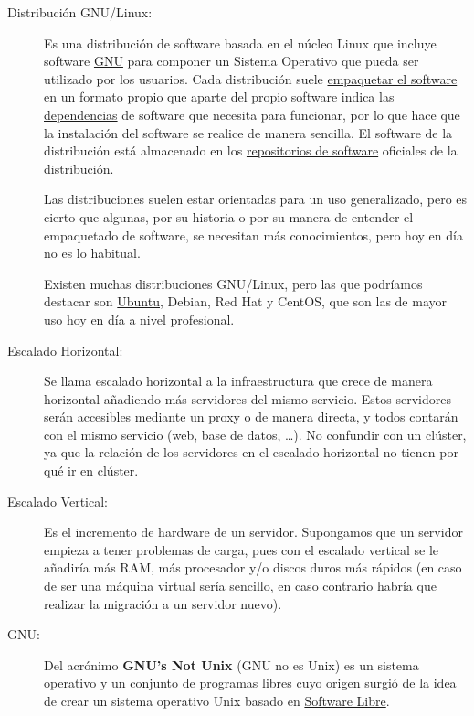 \begin{description}
    \hypertarget{distribucion_gnu_linux}{}
    \item [Distribución GNU/Linux:] Es una distribución de software basada en el núcleo Linux que incluye software \hyperlink{gnu}{GNU} para componer un Sistema Operativo que pueda ser utilizado por los usuarios. Cada distribución suele \hyperlink{paquete_de_software}{empaquetar el software} en un formato propio que aparte del propio software indica las \hyperlink{dependencia_de_software}{dependencias} de software que necesita para funcionar, por lo que hace que la instalación del software se realice de manera sencilla. El software de la distribución está almacenado en los \hyperlink{repositorio_de_software}{repositorios de software} oficiales de la distribución.

    Las distribuciones suelen estar orientadas para un uso generalizado, pero es cierto que algunas, por su historia o por su manera de entender el empaquetado de software, se necesitan más conocimientos, pero hoy en día no es lo habitual.

    Existen muchas distribuciones GNU/Linux, pero las que podríamos destacar son \hyperlink{ubuntu}{Ubuntu}, Debian, Red Hat y CentOS, que son las de mayor uso hoy en día a nivel profesional.

    \hypertarget{escalado_horizontal}{}
    \item[Escalado Horizontal:] Se llama escalado horizontal a la infraestructura que crece de manera horizontal añadiendo más servidores del mismo servicio. Estos servidores serán accesibles mediante un proxy o de manera directa, y todos contarán con el mismo servicio (web, base de datos, …). No confundir con un clúster, ya que la relación de los servidores en el escalado horizontal no tienen por qué ir en clúster.

    \hypertarget{escalado_vertical}{}
    \item[Escalado Vertical:] Es el incremento de hardware de un servidor. Supongamos que un servidor empieza a tener problemas de carga, pues con el escalado vertical se le añadiría más RAM, más procesador y/o discos duros más rápidos (en caso de ser una máquina virtual sería sencillo, en caso contrario habría que realizar la migración a un servidor nuevo).

    \hypertarget{gnu}{}
    \item[GNU:] Del acrónimo \textbf{GNU’s Not Unix} (GNU no es Unix) es un sistema operativo y un conjunto de programas libres cuyo origen surgió de la idea de crear un sistema operativo Unix basado en \hyperlink{software_libre}{Software Libre}.


\end{description}
